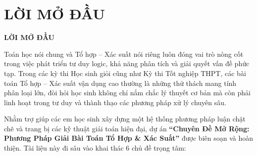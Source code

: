 \documentclass[12pt, a4paper]{article}
\begin{document}
	\section*{LỜI MỞ ĐẦU}
	
	\begin{tcolorbox}[colback=headerbg, colframe=maincolor, arc=3mm, boxrule=1.5pt, halign=center]
		\textbf{\LARGE LỜI MỞ ĐẦU}
	\end{tcolorbox}
	
	\vspace{0.5cm}
	
	\indent Toán học nói chung và Tổ hợp -- Xác suất nói riêng luôn đóng vai trò nòng cốt trong việc phát triển tư duy logic, khả năng phân tích và giải quyết vấn đề phức tạp. Trong các kỳ thi Học sinh giỏi cũng như Kỳ thi Tốt nghiệp THPT, các bài toán Tổ hợp -- Xác suất vận dụng cao thường là những thử thách mang tính phân loại lớn, đòi hỏi học sinh không chỉ nắm chắc lý thuyết cơ bản mà còn phải linh hoạt trong tư duy và thành thạo các phương pháp xử lý chuyên sâu.
	
	\vspace{0.3cm}
	
	\indent Nhằm trợ giúp các em học sinh xây dựng một hệ thống phương pháp luận chặt chẽ và trang bị các kỹ thuật giải toán hiện đại, dự án \textbf{``Chuyên Đề Mở Rộng: Phương Pháp Giải Bài Toán Tổ Hợp \& Xác Suất''} được biên soạn và hoàn thiện. Tài liệu này đi sâu vào khai thác 6 chủ đề trọng tâm:
	
	\vspace{0.3cm}
	
\end{document}
